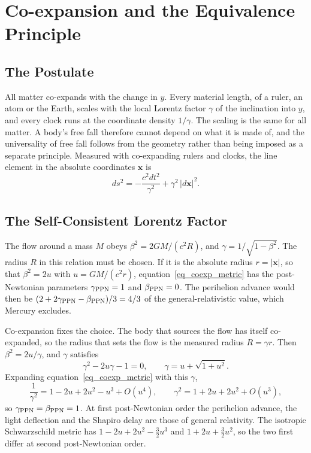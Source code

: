 
\section{Co-expansion and the Equivalence Principle}\label{sec_co_expansion}

\subsection{The Postulate}

All matter co-expands with the change in $y$. Every material length, of a ruler, an atom or the Earth, scales with the local Lorentz factor $\gamma$ of the inclination into $y$, and every clock runs at the coordinate density $1/\gamma$. The scaling is the same for all matter. A body's free fall therefore cannot depend on what it is made of, and the universality of free fall follows from the geometry rather than being imposed as a separate principle. Measured with co-expanding rulers and clocks, the line element in the absolute coordinates $\mathbf{x}$ is
\begin{equation}\label{eq_coexp_metric}
    ds^2=-\frac{c^2dt^2}{\gamma^2}+\gamma^2\,|d\mathbf{x}|^2 .
\end{equation}

\subsection{The Self-Consistent Lorentz Factor}

The flow around a mass $M$ obeys $\beta^2=2GM/(c^2R)$, and $\gamma=1/\sqrt{1-\beta^2}$. The radius $R$ in this relation must be chosen. If it is the absolute radius $r=|\mathbf{x}|$, so that $\beta^2=2u$ with $u=GM/(c^2r)$, equation~\eqref{eq_coexp_metric} has the post-Newtonian parameters $\gamma_{\rm PPN}=1$ and $\beta_{\rm PPN}=0$. The perihelion advance would then be $(2+2\gamma_{\rm PPN}-\beta_{\rm PPN})/3=4/3$ of the general-relativistic value, which Mercury excludes.

Co-expansion fixes the choice. The body that sources the flow has itself co-expanded, so the radius that sets the flow is the measured radius $R=\gamma r$. Then $\beta^2=2u/\gamma$, and $\gamma$ satisfies
\begin{equation}\label{eq_gamma_selfconsistent}
    \gamma^2-2u\gamma-1=0,\qquad \gamma=u+\sqrt{1+u^2}.
\end{equation}
Expanding equation~\eqref{eq_coexp_metric} with this $\gamma$,
\begin{equation}
    \frac{1}{\gamma^2}=1-2u+2u^2-u^3+O(u^4),\qquad \gamma^2=1+2u+2u^2+O(u^3),
\end{equation}
so $\gamma_{\rm PPN}=\beta_{\rm PPN}=1$. At first post-Newtonian order the perihelion advance, the light deflection and the Shapiro delay are those of general relativity. The isotropic Schwarzschild metric has $1-2u+2u^2-\tfrac32u^3$ and $1+2u+\tfrac32u^2$, so the two first differ at second post-Newtonian order.

